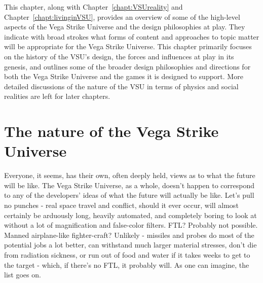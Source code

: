 \label{chapt:overview}
This chapter, along with Chapter~\ref{chapt:VSUreality} and
Chapter~\ref{chapt:livinginVSU}, provides an overview of some of the
high-level aspects of the Vega Strike Universe and the design
philosophies at play. They indicate with broad strokes what forms of
content and approaches to topic matter will be appropriate for the
Vega Strike Universe. This chapter primarily focuses on the history of
the VSU's design, the forces and influences at play in its genesis,
and outlines some of the broader design philosophies and directions
for both the Vega Strike Universe and the games it is designed to
support. More detailed discussions of the nature of the VSU in terms
of physics and social realities are left for later chapters.


\section{The nature of the Vega Strike Universe}
\label{sec:VSUflavor}
Everyone, it seems, has their own, often deeply held, views as to what
the future will be like. The Vega Strike Universe, as a whole, doesn't
happen to correspond to any of the developers' ideas of what the future
will actually be like. Let's pull no punches - real space travel and
conflict, should it ever occur, will almost certainly be arduously
long, heavily automated, and completely boring to look at without a
lot of magnification and false-color filters. FTL? Probably not
possible. Manned airplane-like fighter-craft? Unlikely - missiles and
probes do most of the potential jobs a lot better, can withstand much
larger material stresses, don't die from radiation sickness, or run
out of food and water if it takes weeks to get to the target - which,
if there's no FTL, it probably will. As one can imagine, the list goes
on.

